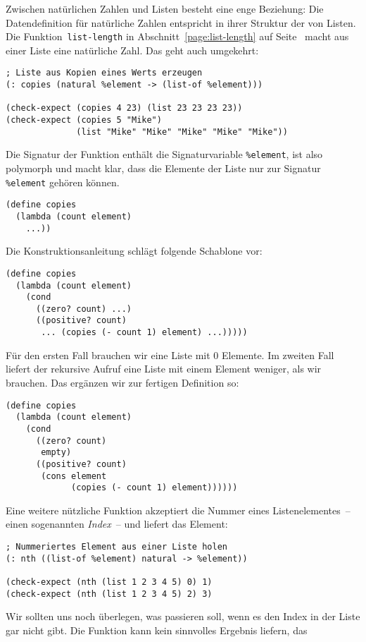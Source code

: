 %
Zwischen natürlichen Zahlen und Listen besteht eine enge Beziehung:
Die Datendefinition für natürliche Zahlen entspricht in ihrer Struktur
der von Listen.  Die Funktion~\lstinline{list-length} in
Abschnitt~\ref{page:list-length} auf Seite~\pageref{page:list-length}
macht aus einer Liste eine natürliche Zahl.  Das geht auch umgekehrt:
%
\begin{lstlisting}
; Liste aus Kopien eines Werts erzeugen
(: copies (natural %element -> (list-of %element)))

(check-expect (copies 4 23) (list 23 23 23 23))
(check-expect (copies 5 "Mike")
              (list "Mike" "Mike" "Mike" "Mike" "Mike"))
\end{lstlisting}
%
Die Signatur der Funktion enthält die Signaturvariable \lstinline{%element}, ist also
polymorph und macht klar, dass die Elemente der Liste nur zur Signatur
\lstinline{%element} gehören können.
%
\begin{lstlisting}
(define copies
  (lambda (count element)
    ...))
\end{lstlisting}
%
Die Konstruktionsanleitung schlägt folgende Schablone vor:
%
\begin{lstlisting}
(define copies
  (lambda (count element)
    (cond
      ((zero? count) ...)
      ((positive? count)
       ... (copies (- count 1) element) ...)))))
\end{lstlisting}
%
Für den ersten Fall brauchen wir eine Liste mit 0 Elemente.  Im
zweiten Fall liefert der rekursive Aufruf eine Liste mit einem Element
weniger, als wir brauchen. Das ergänzen wir zur fertigen Definition
so:
%
\begin{lstlisting}
(define copies
  (lambda (count element)
    (cond
      ((zero? count)
       empty)
      ((positive? count)
       (cons element
             (copies (- count 1) element))))))
\end{lstlisting}
%
Eine weitere nützliche Funktion akzeptiert die Nummer eines
Listenelementes~-- einen sogenannten \textit{Index}~--
und liefert das Element:
%
\begin{lstlisting}
; Nummeriertes Element aus einer Liste holen
(: nth ((list-of %element) natural -> %element))

(check-expect (nth (list 1 2 3 4 5) 0) 1)
(check-expect (nth (list 1 2 3 4 5) 2) 3)
\end{lstlisting}
%
Wir sollten uns noch überlegen, was passieren soll, wenn es den Index in der Liste gar
nicht gibt.  Die Funktion kann kein sinnvolles Ergebnis liefern, das
